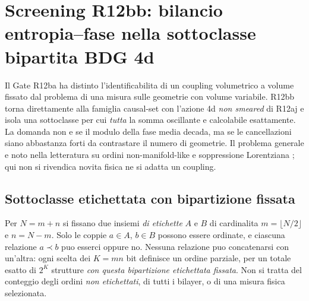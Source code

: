 \documentclass[11pt,a4paper]{article}
\begin{document}
\section{Screening R12bb: bilancio entropia--fase nella sottoclasse bipartita BDG 4d}
\label{sec:r12bb}

Il Gate R12ba ha distinto l'identificabilita di un coupling volumetrico a volume fissato dal problema di una misura sulle geometrie con volume variabile. R12bb torna direttamente alla famiglia causal-set con l'azione 4d \emph{non smeared} di R12aj e isola una sottoclasse per cui \emph{tutta} la somma oscillante e calcolabile esattamente. La domanda non e se il modulo della fase media decada, ma se le cancellazioni siano abbastanza forti da contrastare il numero di geometrie. Il problema generale e noto nella letteratura su ordini non-manifold-like e soppressione Lorentziana \cite{KleitmanRothschild1975,LoomisCarlip2018,Carlip2024}; qui non si rivendica novita fisica ne si adatta un coupling.

\subsection{Sottoclasse etichettata con bipartizione fissata}
Per $N=m+n$ si fissano due insiemi \emph{di etichette} $A$ e $B$ di cardinalita $m=\lfloor N/2\rfloor$ e $n=N-m$. Solo le coppie $a\in A$, $b\in B$ possono essere ordinate, e ciascuna relazione $a\prec b$ puo esserci oppure no. Nessuna relazione puo concatenarsi con un'altra: ogni scelta dei $K=mn$ bit definisce un ordine parziale, per un totale esatto di $2^K$ strutture \emph{con questa bipartizione etichettata fissata}. Non si tratta del conteggio degli ordini \emph{non etichettati}, di tutti i bilayer, o di una misura fisica selezionata.
\end{document}
